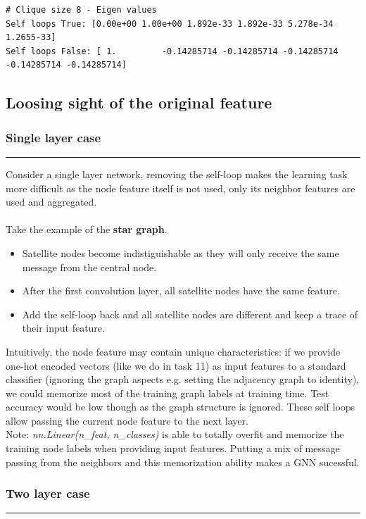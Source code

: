 \documentclass[a4paper]{article}
\begin{document}
\begin{verbatim}
# Clique size 8 - Eigen values
Self loops True: [0.00e+00 1.00e+00 1.892e-33 1.892e-33 5.278e-34 1.2655-33]
Self loops False: [ 1.         -0.14285714 -0.14285714 -0.14285714 -0.14285714 -0.14285714]
\end{verbatim}
\subsection*{Loosing sight of the original feature}
\subsubsection*{Single layer case}
\hrule

Consider a single layer network, removing the self-loop makes the learning task more difficult as the node feature itself is not used, only its neighbor features are used and aggregated.
\\
\\
Take the example of the \textbf{star graph}. 
\begin{itemize}
    \item Satellite nodes become indistiguishable as they will only receive the same message from the central node. 
    \item After the first convolution layer, all satellite nodes have the same feature.
    \item Add the self-loop back and all satellite nodes are different and keep a trace of their input feature.
\end{itemize}

Intuitively, the node feature may contain unique characteristics: 
if we provide one-hot encoded vectors (like we do in task 11) as input features to a standard classifier (ignoring the graph aspects e.g. setting the adjacency graph to identity),
we could memorize most of the training graph labels at training time. Test accuracy would be low though as the graph structure is ignored.
These self loops allow passing the current node feature to the next layer.\\
Note: \textit{nn.Linear(n\_feat, n\_classes)} is able to totally overfit and memorize the training node labels when providing input features.
Putting a mix of message passing from the neighbors and this memorization ability makes a GNN sucessful.



\subsubsection*{Two layer case}
\hrule
\end{document}

